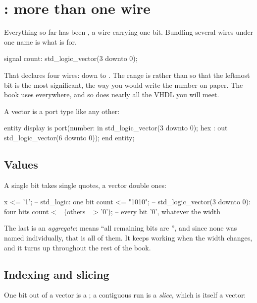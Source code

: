 \section{: more than one wire}
\label{c2:sec:vectors}

Everything so far has been , a wire carrying one bit. Bundling several wires under
one name is what  is for.

\begin{vhdlcode}
signal count: std_logic_vector(3 downto 0);
\end{vhdlcode}

That declares four wires:  down to . The range is 
rather than  so that the leftmost bit is the most significant, the way you would write
the number on paper. The book uses  everywhere, and so does nearly all the VHDL you
will meet.

A vector is a port type like any other:

\begin{vhdlcode}
entity display is
    port(number: in  std_logic_vector(3 downto 0);
         hex   : out std_logic_vector(6 downto 0));
end entity;
\end{vhdlcode}

\subsection*{Values}
A single bit takes single quotes, a vector double ones:

\begin{vhdlcode}
x     <= '1';                -- std_logic: one bit
count <= "1010";             -- std_logic_vector(3 downto 0): four bits
count <= (others => '0');    -- every bit '0', whatever the width
\end{vhdlcode}

The last is an \emph{aggregate}:  means ``all remaining bits are
'', and since none was named individually, that is all of them. It keeps working when the
width changes, and it turns up throughout the rest of the book.

\subsection*{Indexing and slicing}
One bit out of a vector is a ; a contiguous run is a \emph{slice}, which is itself a
vector:

